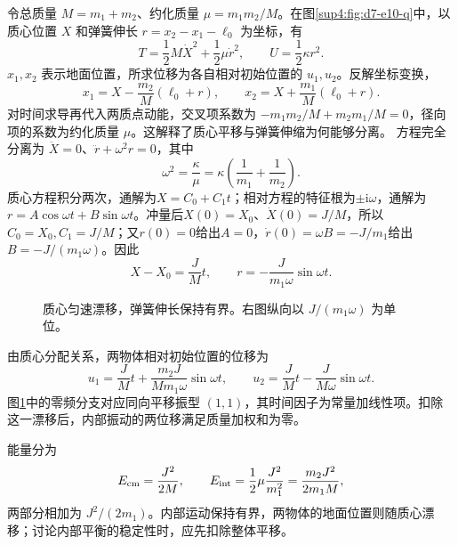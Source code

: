 \begin{solution}
令总质量 $M=m_1+m_2$、约化质量 $\mu=m_1m_2/M$。在图\ref{sup4:fig:d7-e10-q}中，以质心位置 $X$ 和弹簧伸长 $r=x_2-x_1-\ell_0$ 为坐标，有
\[
T=\frac12M\dot X^2+\frac12\mu\dot r^2,\qquad U=\frac12\kappa r^2.
\]
$x_1,x_2$ 表示地面位置，所求位移为各自相对初始位置的 $u_1,u_2$。反解坐标变换，
\[
x_1=X-\frac{m_2}{M}(\ell_0+r),\qquad
x_2=X+\frac{m_1}{M}(\ell_0+r).
\]
对时间求导再代入两质点动能，交叉项系数为 $-m_1m_2/M+m_2m_1/M=0$，径向项的系数为约化质量 $\mu$。这解释了质心平移与弹簧伸缩为何能够分离。
方程完全分离为 $\ddot X=0$、$\ddot r+\omega^2r=0$，其中
\[
\omega^2=\frac\kappa\mu=\kappa\left(\frac1{m_1}+\frac1{m_2}\right).
\]
质心方程积分两次，通解为$X=C_0+C_1t$；相对方程的特征根为$\pm\mathrm i\omega$，通解为$r=A\cos\omega t+B\sin\omega t$。冲量后$X(0)=X_0$、$\dot X(0)=J/M$，所以$C_0=X_0,C_1=J/M$；又$r(0)=0$给出$A=0$，$\dot r(0)=\omega B=-J/m_1$给出$B=-J/(m_1\omega)$。因此
\[
X-X_0=\frac JM t,\qquad r=-\frac{J}{m_1\omega}\sin\omega t.
\]
\begin{figure}[H]\centering
{}
\caption{质心匀速漂移，弹簧伸长保持有界。右图纵向以 $J/(m_1\omega)$ 为单位。}\label{sup4:fig:d7-e10-s}
\end{figure}
由质心分配关系，两物体相对初始位置的位移为
\[
\boxed{u_1=\frac JM t+\frac{m_2J}{Mm_1\omega}\sin\omega t,
\qquad u_2=\frac JM t-\frac{J}{M\omega}\sin\omega t.}
\]
图\ref{sup4:fig:d7-e10-s}中的零频分支对应同向平移振型 $(1,1)$，其时间因子为常量加线性项。扣除这一漂移后，内部振动的两位移满足质量加权和为零。

能量分为
\[
E_{\rm cm}=\frac{J^2}{2M},\qquad
E_{\rm int}=\frac12\mu\frac{J^2}{m_1^2}
=\frac{m_2J^2}{2m_1M},
\]
两部分相加为 $J^2/(2m_1)$。内部运动保持有界，两物体的地面位置则随质心漂移；讨论内部平衡的稳定性时，应先扣除整体平移。
\end{solution}



